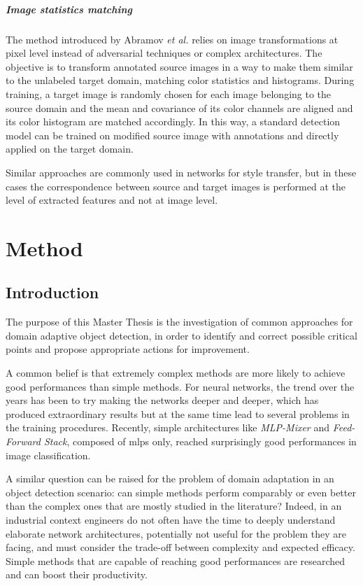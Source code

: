 \documentclass[%
    corpo=12pt,
    twoside,
    stile=classica,   
    tipotesi=magistrale,
    evenboxes,
    english,
	numerazioneromana,
]{toptesi}
\begin{document}
\paragraph{Image statistics matching}\label{sec:kis}
The method introduced by Abramov \emph{et al.}\cite{abramov2020simple} relies on image transformations at pixel level instead of adversarial techniques or complex architectures. The objective is to transform annotated source images in a way to make them similar to the unlabeled target domain, matching color statistics and histograms. During training, a target image is randomly chosen for each image belonging to the source domain and the mean and covariance of its color channels are aligned and its color histogram are matched accordingly. In this way, a standard detection model can be trained on modified source image with annotations and directly applied on the target domain.

Similar approaches are commonly used in networks for style transfer, but in these cases the correspondence between source and target images is performed at the level of extracted features and not at image level.



\chapter{Method}
\section{Introduction}
The purpose of this Master Thesis is the investigation of common approaches for domain adaptive object detection, in order to identify and correct possible critical points and propose appropriate actions for improvement.

A common belief is that extremely complex methods are more likely to achieve good performances than simple methods. For neural networks, the trend over the years has been to try making the networks deeper and deeper, which has produced extraordinary results but at the same time lead to several problems in the training procedures. Recently, simple architectures like \textit{MLP-Mixer}\cite{tolstikhin2021mlpmixer} and \textit{Feed-Forward Stack}\cite{melaskyriazi2021need}, composed of \glspl{mlp} only, reached surprisingly good performances in image classification.

A similar question can be raised for the problem of domain adaptation in an object detection scenario: can simple methods perform comparably or even better than the complex ones that are mostly studied in the literature? Indeed, in an industrial context engineers do not often have the time to deeply understand elaborate network architectures, potentially not useful for the problem they are facing, and must consider the trade-off between complexity and expected efficacy. Simple methods that are capable of reaching good performances are researched and can boost their productivity.
\end{document}
